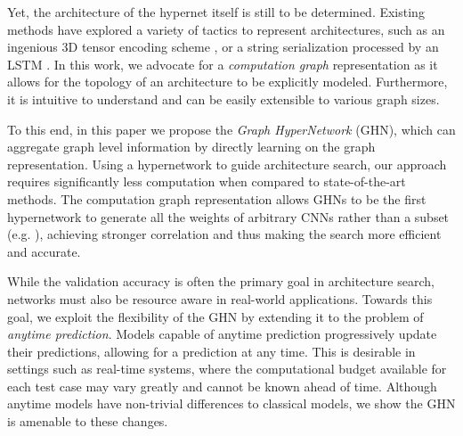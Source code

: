 \documentclass{article} %
\begin{document}
Yet, the architecture of the hypernet itself is still to be determined. Existing methods have
explored a variety of tactics to represent architectures, such as an ingenious 3D tensor encoding
scheme \citep{brock2017smash}, or a string serialization processed by an LSTM
\citep{zoph2016neural,zoph2017learning,pham2018efficient}. In this work, we advocate for a
\textit{computation graph} representation as it allows for the topology of an architecture to be
explicitly modeled. Furthermore, it is intuitive to understand and can be easily extensible to
various graph sizes.

To this end, in this paper we propose the \textit{Graph HyperNetwork} (GHN), which can aggregate
graph level information by directly learning on the graph representation. Using a hypernetwork to
guide architecture search, our approach requires significantly less computation when compared to
state-of-the-art methods. The computation graph representation allows GHNs to be the first
hypernetwork to generate all the weights of arbitrary CNNs rather than a subset (e.g.
\cite{brock2017smash}), achieving stronger correlation and thus making the search more efficient and
accurate.

While the validation accuracy is often the primary goal in architecture search, networks must also
be resource aware in real-world applications. Towards this goal, we exploit the flexibility of the
GHN by extending it to the problem of \textit{anytime prediction}. Models capable of anytime
prediction progressively update their predictions, allowing for a prediction at any time. This is
desirable in settings such as real-time systems, where the computational budget available for each
test case may vary greatly and cannot be known ahead of time. Although anytime models have
non-trivial differences to classical models, we show the GHN is amenable to these changes.
 
\end{document}
